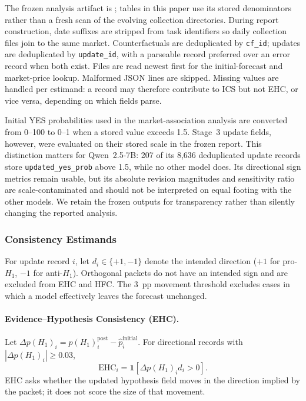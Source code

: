 The frozen analysis artifact is
; tables in
this paper use its stored denominators rather than a fresh scan of the evolving
collection directories.  During report construction, date suffixes are stripped from
task identifiers so daily collection files join to the same market.  Counterfactuals
are deduplicated by \texttt{cf\_id}; updates are deduplicated by
\texttt{update\_id}, with a parseable record preferred over an error record when both
exist.  Files are read newest first for the initial-forecast and market-price lookup.
Malformed JSON lines are skipped.  Missing values are handled per estimand: a record
may therefore contribute to ICS but not EHC, or vice versa, depending on which fields
parse.

Initial YES probabilities used in the market-association analysis are converted from
0--100 to 0--1 when a stored value exceeds 1.5.  Stage~3 update fields, however, were
evaluated on their stored scale in the frozen report.  This distinction matters for
Qwen~2.5-7B: 207 of its 8,636 deduplicated update records store
\texttt{updated\_yes\_prob} above 1.5, while no other model does.  Its directional
sign metrics remain usable, but its absolute revision magnitudes and sensitivity ratio
are scale-contaminated and should not be interpreted on equal footing with the other
models.  We retain the frozen outputs for transparency rather than silently changing
the reported analysis.

\subsubsection{Consistency Estimands}
\label{app:metric-definitions}

For update record \(i\), let \(d_i\in\{+1,-1\}\) denote the intended direction
(\(+1\) for pro-$H_1$, \(-1\) for anti-$H_1$).  Orthogonal packets do not have an
intended sign and are excluded from EHC and HFC.  The 3~pp movement threshold excludes
cases in which a model effectively leaves the forecast unchanged.

\paragraph{Evidence--Hypothesis Consistency (EHC).}
Let \(\Delta p(H_1)_i=p(H_1)_i^{\mathrm{post}}-\hat p_i^{\mathrm{initial}}\).
For directional records with \(|\Delta p(H_1)_i|\geq0.03\),
\begin{equation}
  \mathrm{EHC}_i=\mathbf{1}\!\left[\Delta p(H_1)_i d_i>0\right].
  \label{eq:ehc}
\end{equation}
EHC asks whether the updated hypothesis field moves in the direction implied by the
packet; it does not score the size of that movement.

